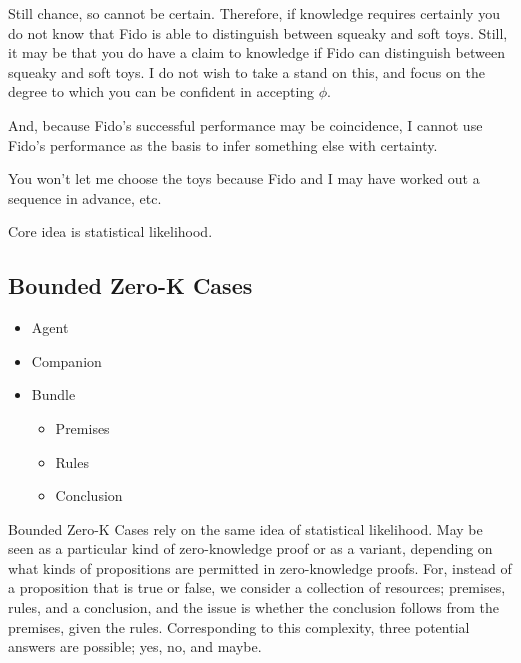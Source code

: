 \documentclass[10pt]{article}
\begin{document}
Still chance, so cannot be certain.
Therefore, if knowledge requires certainly you do not know that Fido is able to distinguish between squeaky and soft toys.
Still, it may be that you do have a claim to knowledge if Fido can distinguish between squeaky and soft toys.
I do not wish to take a stand on this, and focus on the degree to which you can be confident in accepting \(\phi\).

And, because Fido's successful performance may be coincidence, I cannot use Fido's performance as the basis to infer something else with certainty.

You won't let me choose the toys because Fido and I may have worked out a sequence in advance, etc.

Core idea is statistical likelihood.

\subsection{Bounded Zero-K Cases}
\label{sec:bounded-zero-k}

\begin{itemize}
\item Agent
\item Companion
\item Bundle
  \begin{itemize}
  \item Premises
  \item Rules
  \item Conclusion
  \end{itemize}
\end{itemize}

Bounded Zero-K Cases rely on the same idea of statistical likelihood.
May be seen as a particular kind of zero-knowledge proof or as a variant, depending on what kinds of propositions are permitted in zero-knowledge proofs.
For, instead of a proposition that is true or false, we consider a collection of resources; premises, rules, and a conclusion, and the issue is whether the conclusion follows from the premises, given the rules.
Corresponding to this complexity, three potential answers are possible; yes, no, and maybe.
\end{document}
